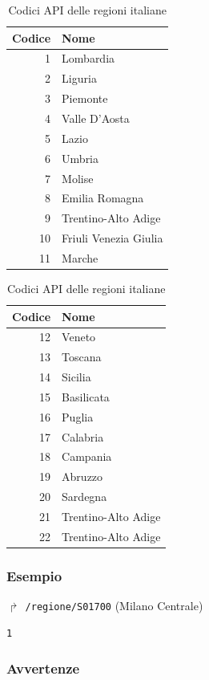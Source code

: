 \documentclass[12pt,italian]{report}
\begin{document}
\begin{table}[h] \centering
    \begin{tabular}{r|l}
      Codice & Nome \\
      \hline
      1 & Lombardia \\
      2 & Liguria \\
      3 & Piemonte \\
      4 & Valle D'Aosta \\
      5 & Lazio \\
      6 & Umbria \\
      7 & Molise \\
      8 & Emilia Romagna \\
      9 & Trentino-Alto Adige \\
      10 & Friuli Venezia Giulia \\
      11 & Marche \\
    \end{tabular}
    \begin{tabular}{r|l}
      Codice & Nome \\
      \hline
      12 & Veneto \\
      13 & Toscana \\
      14 & Sicilia \\
      15 & Basilicata \\
      16 & Puglia \\
      17 & Calabria \\
      18 & Campania \\
      19 & Abruzzo \\
      20 & Sardegna \\
      21 & Trentino-Alto Adige \\
      22 & Trentino-Alto Adige
    \end{tabular}
    \caption{Codici API delle regioni italiane}
    \label{regioni}
\end{table}

\subsubsection{Esempio}

$\Rsh$ \texttt{/regione/S01700} \hfill (Milano Centrale)
\begin{verbatim}
1
\end{verbatim}

\subsubsection{Avvertenze}
\end{document}
